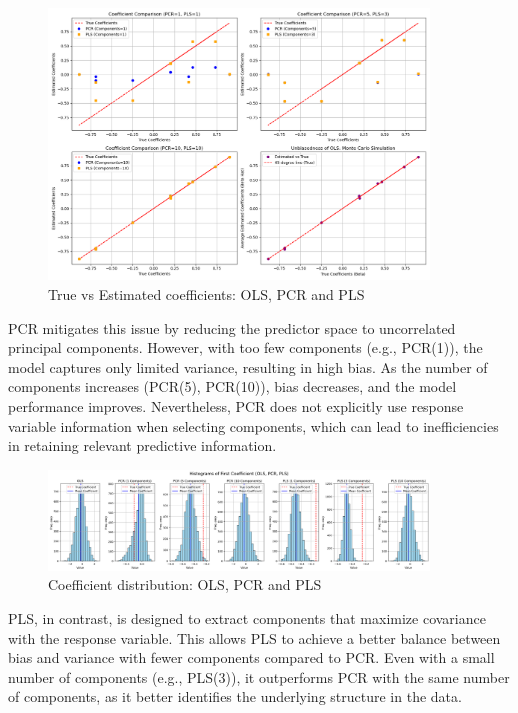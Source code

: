 \documentclass[11pt,twoside,a4paper]{article}
\begin{document}
\begin{figure}[H]
    \centering
    \includegraphics[width=0.9\textwidth]{First_plot_second_simulation.png}
    \caption{True vs Estimated coefficients: OLS, PCR and PLS}
    \label{fig:PLS_analysis}
\end{figure}

PCR mitigates this issue by reducing the predictor space to uncorrelated principal components. However, with too few components (e.g., PCR(1)), the model captures only limited variance, resulting in high bias. As the number of components increases (PCR(5), PCR(10)), bias decreases, and the model performance improves. Nevertheless, PCR does not explicitly use response variable information when selecting components, which can lead to inefficiencies in retaining relevant predictive information.

\begin{figure}[H]
    \centering
    \includegraphics[width=0.9\textwidth]{Fourth_plot_second_simulation.png}
    \caption{Coefficient distribution: OLS, PCR and PLS}
    \label{fig:PLS_analysis}
\end{figure}

PLS, in contrast, is designed to extract components that maximize covariance with the response variable. This allows PLS to achieve a better balance between bias and variance with fewer components compared to PCR. Even with a small number of components (e.g., PLS(3)), it outperforms PCR with the same number of components, as it better identifies the underlying structure in the data.
\end{document}
